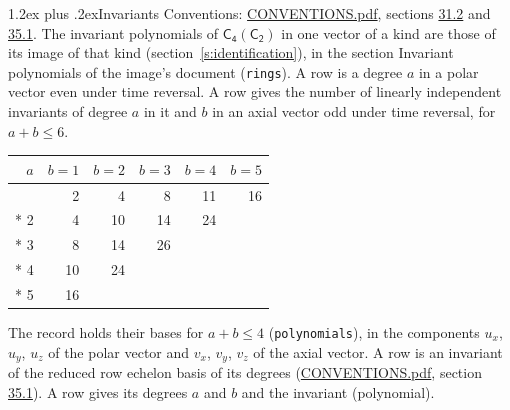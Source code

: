 \documentclass[10pt,a4paper]{article}
\makeatletter
\renewcommand\section{\@startsection{section}{1}{\z@}{-3ex plus -1ex minus -.2ex}%
  {1.2ex plus .2ex}{\normalfont\large\sffamily\bfseries\color{parttitle}}}
\numberwithin{equation}{section}
\newcommand{\grp}[1]{\mathsf{#1}}
\makeatother
\begin{document}
\section{Invariants}\label{s:invariants}
Conventions: \href{../../CONVENTIONS.pdf}{CONVENTIONS.pdf}, sections \href{../../CONVENTIONS.pdf\#conv.31.2}{31.2} and \href{../../CONVENTIONS.pdf\#conv.35.1}{35.1}.
The invariant polynomials of $\grp{C_{4}}(\grp{C_{2}})$ in one vector of a kind are those of its image of that kind (section~\ref{s:identification}), in the section Invariant polynomials of the image's document (\texttt{rings}).
\leavevmode\label{n:index.degree.polar}\label{n:index.degree.axial}A row is a degree $a$ in a polar vector even under time reversal. A row gives the number of linearly independent invariants of degree $a$ in it and $b$ in an axial vector odd under time reversal, for $a + b \le 6$.
{\small\begin{longtable}{@{}rrrrrr@{}}\toprule
$a$ & $b = 1$ & $b = 2$ & $b = 3$ & $b = 4$ & $b = 5$\\\midrule\endhead
\bottomrule\endfoot\endlastfoot
1 & 2 & 4 & 8 & 11 & 16\\*
2 & 4 & 10 & 14 & 24 & \\*
3 & 8 & 14 & 26 &  & \\*
4 & 10 & 24 &  &  & \\*
5 & 16 &  &  &  & \\
\bottomrule\end{longtable}}
\leavevmode\label{n:local.component.polar}\label{n:local.component.axial}The record holds their bases for $a + b \le 4$ (\texttt{polynomials}), in the components $u_{x}$, $u_{y}$, $u_{z}$ of the polar vector and $v_{x}$, $v_{y}$, $v_{z}$ of the axial vector. \label{n:head.polynomial}A row is an invariant of the reduced row echelon basis of its degrees (\href{../../CONVENTIONS.pdf}{CONVENTIONS.pdf}, section \href{../../CONVENTIONS.pdf\#conv.35.1}{35.1}). A row gives its degrees $a$ and $b$ and the invariant (polynomial).
\end{document}
